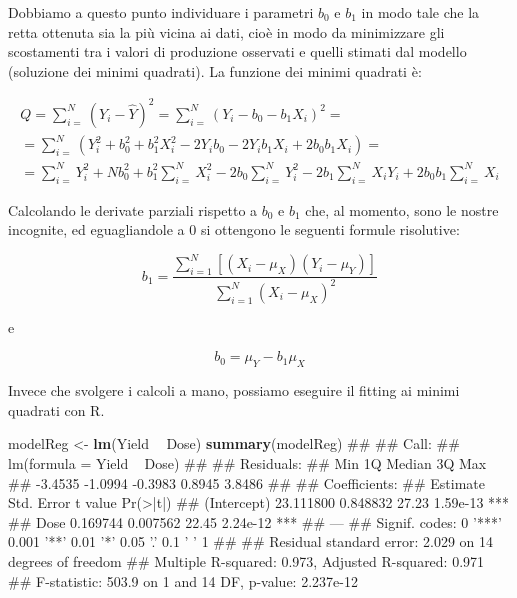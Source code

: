 \documentclass[a4paper,12pt,oneside]{book}
\newenvironment{Shaded}{\begin{snugshade}}{\end{snugshade}}
\newcommand{\KeywordTok}[1]{\textcolor[rgb]{0.13,0.29,0.53}{\textbf{#1}}}
\newcommand{\StringTok}[1]{\textcolor[rgb]{0.31,0.60,0.02}{#1}}
\newcommand{\OperatorTok}[1]{\textcolor[rgb]{0.81,0.36,0.00}{\textbf{#1}}}
\newcommand{\NormalTok}[1]{#1}
\theoremstyle{definition}
\theoremstyle{definition}
\theoremstyle{definition}
\theoremstyle{remark}
\begin{document}
Dobbiamo a questo punto individuare i parametri \(b_0\) e \(b_1\) in
modo tale che la retta ottenuta sia la più vicina ai dati, cioè in modo
da minimizzare gli scostamenti tra i valori di produzione osservati e
quelli stimati dal modello (soluzione dei minimi quadrati). La funzione
dei minimi quadrati è:

\[\begin{array}{l}
Q = \sum\limits_{i = }^N {\left( {{Y_i} - \hat Y} \right)^2 = \sum\limits_{i = }^N {{{\left( {{Y_i} - {b_0} - {b_1}{X_i}} \right)}^2}}  = } \\
 = \sum\limits_{i = }^N {\left( {Y_i^2 + b_0^2 + b_1^2X_i^2 - 2{Y_i}{b_0} - 2{Y_i}{b_1}{X_i} + 2{b_0}{b_1}{X_i}} \right)}  = \\
 = \sum\limits_{i = }^N {Y_i^2 + Nb_0^2 + b_1^2\sum\limits_{i = }^N {X_i^2 - 2{b_0}\sum\limits_{i = }^N {Y_i^2 - 2{b_1}\sum\limits_{i = }^N {{X_i}{Y_i} + } } } } 2{b_0}{b_1}\sum\limits_{i = }^N {{X_i}} 
\end{array}\]

Calcolando le derivate parziali rispetto a \(b_0\) e \(b_1\) che, al
momento, sono le nostre incognite, ed eguagliandole a 0 si ottengono le
seguenti formule risolutive:

\[{b_1} = \frac{{\sum\limits_{i = 1}^N {\left[ {\left( {{X_i} - {\mu _X}} \right)\left( {{Y_i} - {\mu _Y}} \right)} \right]} }}{{\sum\limits_{i = 1}^N {{{\left( {{X_i} - {\mu _X}} \right)}^2}} }}\]

e

\[{b_0} = {\mu _Y} - {b_1}{\mu _X}\]

Invece che svolgere i calcoli a mano, possiamo eseguire il fitting ai
minimi quadrati con R.

\begin{Shaded}
\begin{Highlighting}[]
\NormalTok{modelReg <-}\StringTok{ }\KeywordTok{lm}\NormalTok{(Yield }\OperatorTok{~}\StringTok{ }\NormalTok{Dose)}
\KeywordTok{summary}\NormalTok{(modelReg)}
\NormalTok{## }
\NormalTok{## Call:}
\NormalTok{## lm(formula = Yield ~ Dose)}
\NormalTok{## }
\NormalTok{## Residuals:}
\NormalTok{##     Min      1Q  Median      3Q     Max }
\NormalTok{## -3.4535 -1.0994 -0.3983  0.8945  3.8486 }
\NormalTok{## }
\NormalTok{## Coefficients:}
\NormalTok{##              Estimate Std. Error t value Pr(>|t|)    }
\NormalTok{## (Intercept) 23.111800   0.848832   27.23 1.59e-13 ***}
\NormalTok{## Dose         0.169744   0.007562   22.45 2.24e-12 ***}
\NormalTok{## ---}
\NormalTok{## Signif. codes:  0 '***' 0.001 '**' 0.01 '*' 0.05 '.' 0.1 ' ' 1}
\NormalTok{## }
\NormalTok{## Residual standard error: 2.029 on 14 degrees of freedom}
\NormalTok{## Multiple R-squared:  0.973,  Adjusted R-squared:  0.971 }
\NormalTok{## F-statistic: 503.9 on 1 and 14 DF,  p-value: 2.237e-12}
\end{Highlighting}
\end{Shaded}
\end{document}
